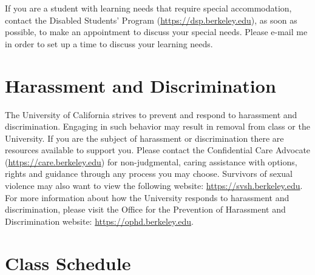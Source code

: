 \documentclass[letterpaper]{inzane_syllabus} %
\begin{document}
If you are a student with learning needs that require special accommodation, contact the Disabled Students' Program (\url{https://dsp.berkeley.edu}), as soon as possible, to make an appointment to discuss your special needs.  Please e-mail me in order to set up a time to discuss your learning needs.

\vspace{0.5cm}
\section{Harassment and Discrimination}

The University of California strives to prevent and respond to harassment and discrimination. Engaging in such behavior may result in removal from class or the University. If you are the subject of harassment or discrimination there are resources available to support you. Please contact the Confidential Care Advocate (\url{https://care.berkeley.edu}) for non-judgmental, caring assistance with options, rights and guidance through any process you may choose. Survivors of sexual violence may also want to view the following website: \url{https://svsh.berkeley.edu}.
For more information about how the University responds to harassment and discrimination, please visit the Office for the Prevention of Harassment and Discrimination website: \url{https://ophd.berkeley.edu}.\\


\newpage
\makeFullPage
\section{Class Schedule}
\end{document}
